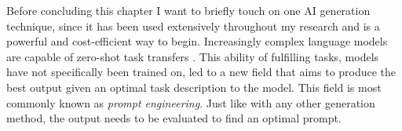 Before concluding this chapter I want to briefly touch on one AI generation technique, since it has been used extensively throughout my research and is a powerful and cost-efficient way to begin. Increasingly complex language models are capable of zero-shot task transfers \cite{radford2019language}. This ability of fulfilling tasks, models have not specifically been trained on, led to a new field that aims to produce the best output given an optimal task description to the model. This field is most commonly known as \emph{prompt engineering}. Just like with any other generation method, the output needs to be evaluated to find an optimal prompt.